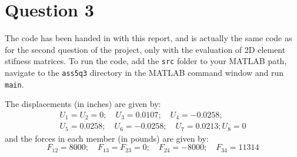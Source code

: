 \section{Question 3}
The code has been handed in with this report, and is actually the same code as for
the second question of the project, only with the evaluation of 2D element stifness
matrices. To run the code, add the \texttt{src} folder to your MATLAB path, navigate
to the \texttt{ass5q3} directory in the MATLAB command window and run \texttt{main}.

The displacements (in inches) are given by:
\begin{gather*}
    U_1 = U_2 = 0; \quad U_3 = 0.0107; \quad U_4 = -0.0258;\\
    U_5 = 0.0258; \quad U_6 = -0.0258; \quad U_7 = 0.0213; U_8 = 0
\end{gather*}
and the forces in each member (in pounds) are given by:
\begin{equation*}
    F_{12} = 8000; \quad F_{13} = F_{23} = 0; \quad F_{24} = -8000; \quad F_{34} = 11314
\end{equation*}
